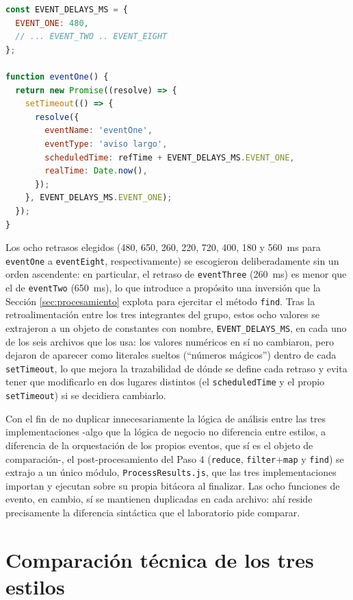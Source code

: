\documentclass[conference,a4paper]{IEEEtran}
\begin{document}
\begin{lstlisting}[language=JavaScript, caption={Patr\'on de definici\'on de un evento (AsyncImpl.js).}, label={lst:eventone}]
const EVENT_DELAYS_MS = {
  EVENT_ONE: 480,
  // ... EVENT_TWO .. EVENT_EIGHT
};

function eventOne() {
  return new Promise((resolve) => {
    setTimeout(() => {
      resolve({
        eventName: 'eventOne',
        eventType: 'aviso largo',
        scheduledTime: refTime + EVENT_DELAYS_MS.EVENT_ONE,
        realTime: Date.now(),
      });
    }, EVENT_DELAYS_MS.EVENT_ONE);
  });
}
\end{lstlisting}

Los ocho retrasos elegidos (480, 650, 260, 220, 720, 400, 180 y 560~ms para \texttt{eventOne} a \texttt{eventEight}, respectivamente) se escogieron deliberadamente sin un orden ascendente: en particular, el retraso de \texttt{eventThree} (260~ms) es menor que el de \texttt{eventTwo} (650~ms), lo que introduce a prop\'osito una inversi\'on que la Secci\'on \ref{sec:procesamiento} explota para ejercitar el m\'etodo \texttt{find}. Tras la retroalimentaci\'on entre los tres integrantes del grupo, estos ocho valores se extrajeron a un objeto de constantes con nombre, \texttt{EVENT\_DELAYS\_MS}, en cada uno de los seis archivos que los usa: los valores num\'ericos en s\'i no cambiaron, pero dejaron de aparecer como literales sueltos (``n\'umeros m\'agicos'') dentro de cada \texttt{setTimeout}, lo que mejora la trazabilidad de d\'onde se define cada retraso y evita tener que modificarlo en dos lugares distintos (el \texttt{scheduledTime} y el propio \texttt{setTimeout}) si se decidiera cambiarlo.

Con el fin de no duplicar innecesariamente la l\'ogica de an\'alisis entre las tres implementaciones -algo que la l\'ogica de negocio no diferencia entre estilos, a diferencia de la orquestaci\'on de los propios eventos, que s\'i es el objeto de comparaci\'on-, el post-procesamiento del Paso 4 (\texttt{reduce}, \texttt{filter}+\texttt{map} y \texttt{find}) se extrajo a un \'unico m\'odulo, \texttt{ProcessResults.js}, que las tres implementaciones importan y ejecutan sobre su propia bit\'acora al finalizar. Las ocho funciones de evento, en cambio, s\'i se mantienen duplicadas en cada archivo: ah\'i reside precisamente la diferencia sint\'actica que el laboratorio pide comparar.

\section{Comparaci\'on t\'ecnica de los tres estilos}
\label{sec:comparacion}
\end{document}
